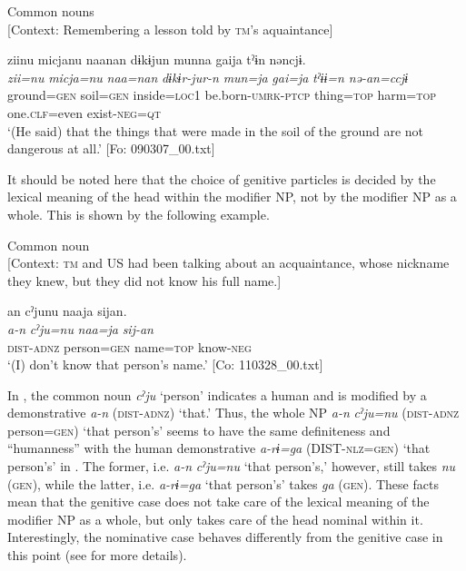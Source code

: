 \ex Common nouns\\{}
[Context: Remembering a lesson told by \textsc{tm}’s aquaintance]

{\TM}
\glll ziinu  micjanu  naanan  dɨkɨjun  munna      gaija  tˀɨn  nəncjɨ.\\
      \textit{zii=nu}  \textit{micja=nu}  \textit{naa=nan}  \textit{dɨkɨr-jur-n}  \textit{mun=ja}      \textit{gai=ja}  \textit{tˀɨɨ=n}  \textit{nə-an=ccjɨ}\\
      ground=\textsc{gen}  soil=\textsc{gen}  inside=\textsc{loc1}  be.born-\textsc{umrk}-\textsc{ptcp}  thing=\textsc{top}      harm=\textsc{top}  one.\textsc{clf}=even  exist-\textsc{neg}=\textsc{qt}\\
\glt ‘(He said) that the things that were made in the soil of the ground are not dangerous at all.’ [Fo: 090307\_00.txt]
\z
\z

It should be noted here that the choice of genitive particles is decided by the lexical meaning of the head within the modifier NP, not by the modifier NP as a whole. This is shown by the following example.

\ea\label{ex:6-109}
  Common noun\\{}
  [Context: \textsc{tm} and US had been talking about an acquaintance, whose nickname they knew, but they did not know his full name.]

{\TM}
\glll an  cˀjunu  naaja  sijan.\\
\textit{a-n}  \textit{cˀju=nu}  \textit{naa=ja}  \textit{sij-an}\\
    \textsc{dist}-\textsc{adnz}  person=\textsc{gen}  name=\textsc{top}  know-\textsc{neg}\\
\glt    ‘(I) don’t know that person’s name.’ [Co: 110328\_00.txt]
\z

In , the common noun \textit{cˀju} ‘person’ indicates a human and is modified by a demonstrative \textit{a-n} (\textsc{dist}-\textsc{adnz}) ‘that.’ Thus, the whole NP \textit{a-n} \textit{cˀju=nu} (\textsc{dist}-\textsc{adnz} person=\textsc{gen}) ‘that person’s’ seems to have the same definiteness and “humanness” with the human demonstrative \textit{a-rɨ=ga} (DIST-\textsc{nlz}=\textsc{gen}) ‘that person’s’ in . The former, i.e. \textit{a-n} \textit{cˀju=nu} ‘that person’s,’ however, still takes \textit{nu} (\textsc{gen}), while the latter, i.e. \textit{a-rɨ=ga} ‘that person’s’ takes \textit{ga} (\textsc{gen}). These facts mean that the genitive case does not take care of the lexical meaning of the modifier NP as a whole, but only takes care of the head nominal within it. Interestingly, the nominative case behaves differently from the genitive case in this point (see  for more details).

